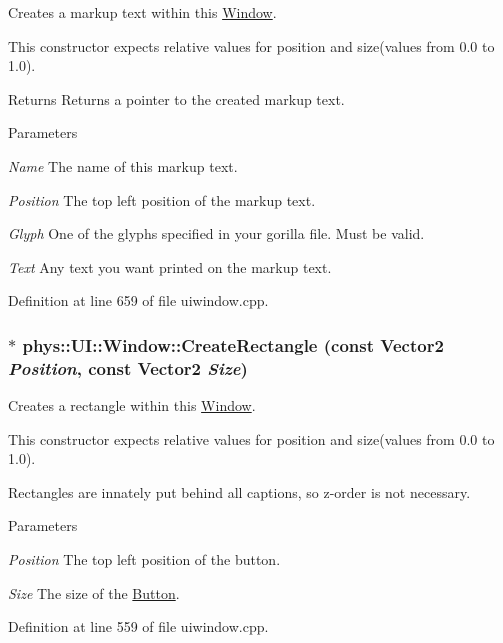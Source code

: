 Creates a markup text within this \hyperlink{classphys_1_1UI_1_1Window}{Window}. 

This constructor expects relative values for position and size(values from 0.0 to 1.0). \begin{DoxyReturn}{Returns}
Returns a pointer to the created markup text. 
\end{DoxyReturn}

\begin{DoxyParams}{Parameters}
\item[{\em Name}]The name of this markup text. \item[{\em Position}]The top left position of the markup text. \item[{\em Glyph}]One of the glyphs specified in your gorilla file. Must be valid. \item[{\em Text}]Any text you want printed on the markup text. \end{DoxyParams}


Definition at line 659 of file uiwindow.cpp.

\hypertarget{classphys_1_1UI_1_1Window_a7a4e6a554f4b35200197242a779cde4a}{
\subsubsection[{CreateRectangle}]{ $\ast$ phys::UI::Window::CreateRectangle (const {\bf Vector2} {\em Position}, \/  const {\bf Vector2} {\em Size})}}
\label{d4/d86/classphys_1_1UI_1_1Window_a7a4e6a554f4b35200197242a779cde4a}


Creates a rectangle within this \hyperlink{classphys_1_1UI_1_1Window}{Window}. 

This constructor expects relative values for position and size(values from 0.0 to 1.0). \par
 Rectangles are innately put behind all captions, so z-\/order is not necessary. 
\begin{DoxyParams}{Parameters}
\item[{\em Position}]The top left position of the button. \item[{\em Size}]The size of the \hyperlink{classphys_1_1UI_1_1Button}{Button}. \end{DoxyParams}


Definition at line 559 of file uiwindow.cpp.

